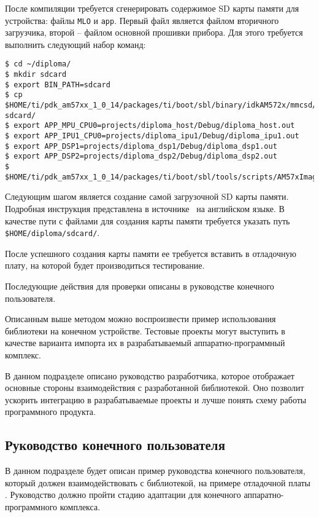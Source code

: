 После компиляции требуется сгенерировать содержимое SD карты памяти для устройства:
файлы \lstinline{MLO} и \lstinline{app}. Первый файл является файлом вторичного загрузчика,
второй -- файлом основной прошивки прибора.
Для этого требуется выполнить следующий набор команд:
\begin{lstlisting}
$ cd ~/diploma/
$ mkdir sdcard
$ export BIN_PATH=sdcard
$ cp $HOME/ti/pdk_am57xx_1_0_14/packages/ti/boot/sbl/binary/idkAM572x/mmcsd/bin/MLO sdcard/
$ export APP_MPU_CPU0=projects/diploma_host/Debug/diploma_host.out
$ export APP_IPU1_CPU0=projects/diploma_ipu1/Debug/diploma_ipu1.out
$ export APP_DSP1=projects/diploma_dsp1/Debug/diploma_dsp1.out
$ export APP_DSP2=projects/diploma_dsp2/Debug/diploma_dsp2.out
$ $HOME/ti/pdk_am57xx_1_0_14/packages/ti/boot/sbl/tools/scripts/AM57xImageGen.sh
\end{lstlisting}

Следующим шагом является создание самой загрузочной SD карты памяти. Подробная
инструкция представлена в источнике~\cite{tirtos_sdcard_create_site} на
английском языке. В качестве пути с файлами для создания карты памяти
требуется указать путь \lstinline{$HOME/diploma/sdcard/}.

После успешного создания карты памяти ее требуется вставить в отладочную плату,
на которой будет производиться тестирование.

Последующие действия для проверки описаны в руководстве конечного пользователя.

Описанным выше методом можно воспроизвести пример использования библиотеки на
конечном устройстве. Тестовые проекты могут выступить в качестве варианта
импорта их в разрабатываемый аппаратно-программный комплекс.

В данном подразделе описано руководство разработчика,
которое отображает основные стороны взаимодействия с разработанной библиотекой.
Оно позволит ускорить интеграцию в разрабатываемые проекты и лучше понять
схему работы программного продукта.

\subsection{Руководство конечного пользователя}

В данном подразделе будет описан пример руководства конечного пользователя,
который должен взаимодействовать с библиотекой, на примере отладочной платы
. Руководство должно пройти стадию адаптации для конечного
аппаратно-программного комплекса.

